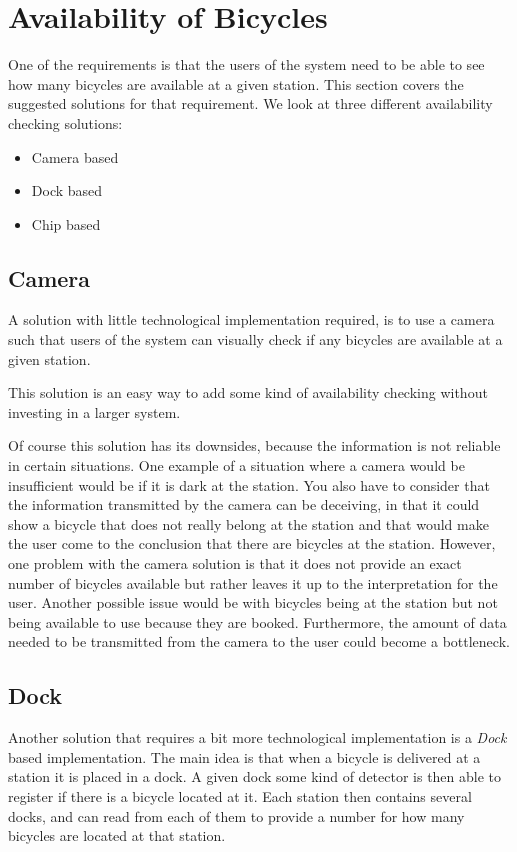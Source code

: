 \section{Availability of Bicycles}\label{sec:availability}
One of the requirements is that the users of the system need to be able to see how many bicycles are available at a given station.
This section covers the suggested solutions for that requirement.
We look at three different availability checking solutions:

\begin{itemize}
\item Camera based
\item Dock based
\item Chip based
\end{itemize} 

\subsection{Camera}
A solution with little technological implementation required, is to use a camera such that users of the system can visually check if any bicycles are available at a given station. 

This solution is an easy way to add some kind of availability checking without investing in a larger system.

Of course this solution has its downsides, because the information is not reliable in certain situations. 
One example of a situation where a camera would be insufficient would be if it is dark at the station.
You also have to consider that the information transmitted by the camera can be deceiving, in that it could show a bicycle that does not really belong at the station and that would make the user come to the conclusion that there are bicycles at the station.
However, one problem with the camera solution is that it does not provide an exact number of bicycles available but rather leaves it up to the interpretation for the user.
Another possible issue would be with bicycles being at the station but not being available to use because they are booked.
Furthermore, the amount of data needed to be transmitted from the camera to the user could become a bottleneck.

\subsection{Dock}
Another solution that requires a bit more technological implementation is a \textit{Dock} based implementation.
The main idea is that when a bicycle is delivered at a station it is placed in a dock.
A given dock some kind of detector is then able to register if there is a bicycle located at it.
Each station then contains several docks, and can read from each of them to provide a number for how many bicycles are located at that station. 

